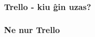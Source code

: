   \begin{frame}
    \frametitle{Trello - kiu ĝin uzas?}
    
    
  \end{frame}
  
  

  \begin{frame}
    \frametitle{Ne nur Trello}
    
  \end{frame}

